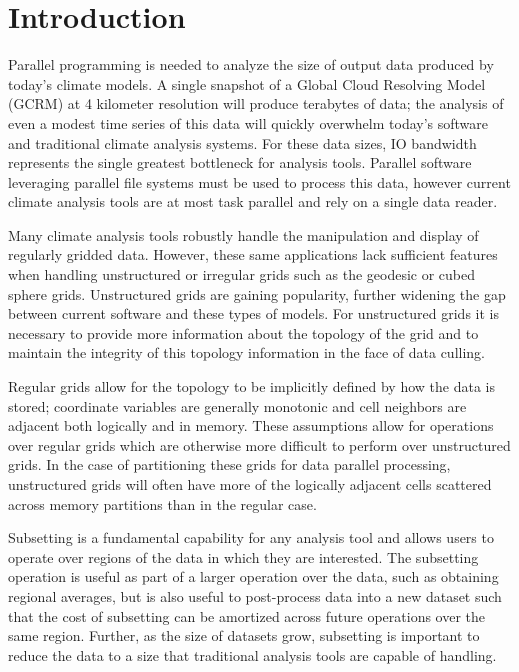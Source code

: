 \section{Introduction}
\label{section:introduction}

Parallel programming is needed to analyze the size of output data produced by
today's climate models\cite{MODSIM07:LOT,WASHINGTON08}.  A single snapshot of
a Global Cloud Resolving Model (GCRM) at 4 kilometer resolution will produce
terabytes of data\cite{GCRM}; the analysis of even a modest time series of
this data will quickly overwhelm today's software and traditional climate
analysis systems.  For these data sizes, IO bandwidth represents the single
greatest bottleneck for analysis tools.  Parallel software leveraging parallel
file systems must be used to process this data, however current climate
analysis tools are at most task parallel and rely on a single data
reader\cite{CDAT,CDO,NCO}.

Many climate analysis tools robustly handle the manipulation and display of
regularly gridded data.  However, these same applications lack sufficient
features when handling unstructured or irregular grids such as the
geodesic\cite{GEODESIC} or cubed sphere\cite{CUBE} grids.  Unstructured grids
are gaining popularity, further widening the gap between current software and
these types of models.  For unstructured grids it is necessary to provide more
information about the topology of the grid and to maintain the integrity of
this topology information in the face of data culling.

Regular grids allow for the topology to be implicitly defined by how the data
is stored; coordinate variables are generally monotonic and cell neighbors are
adjacent both logically and in memory.  These assumptions allow for operations
over regular grids which are otherwise more difficult to perform over
unstructured grids.  In the case of partitioning these grids for data parallel
processing, unstructured grids will often have more of the logically adjacent
cells scattered across memory partitions than in the regular case.

Subsetting is a fundamental capability for any analysis tool and allows users
to operate over regions of the data in which they are interested.  The
subsetting operation is useful as part of a larger operation over the data,
such as obtaining regional averages, but is also useful to post-process data
into a new dataset such that the cost of subsetting can be amortized across
future operations over the same region.  Further, as the size of datasets
grow, subsetting is important to reduce the data to a size that traditional
analysis tools are capable of handling. 

